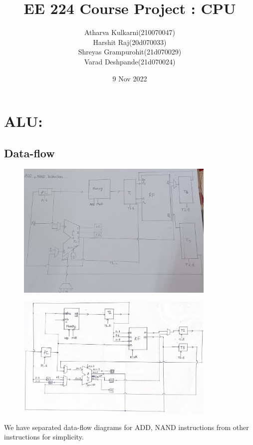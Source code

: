 \documentclass[]{report}
\title{EE 224 Course Project : CPU}
\author{Atharva Kulkarni(210070047) \\Harshit Raj(20d070033) \\
 Shreyas Grampurohit(21d070029) \\ Varad Deshpande(21d070024)}
\date{9 Nov 2022}
\begin{document}
\maketitle
\section*{ALU:}
\subsection*{Data-flow}
\begin{figure}[H]
    \begin{center}
        \includegraphics*[width=0.85\textwidth]{ADDNAND.jpg}
    \end{center}
\end{figure}
    \begin{figure}[H]
        \begin{center}
            \includegraphics*[width=0.85\textwidth]{BEQ+JAL+JLR.jpg}
        \end{center}
    \end{figure}
We have separated data-flow diagrams for ADD, NAND instructions from other instructions for simplicity.
\end{document}
